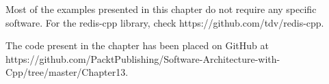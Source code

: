 Most of the examples presented in this chapter do not require any specific software. For the redis-cpp library, check https://github.com/tdv/redis-cpp.

The code present in the chapter has been placed on GitHub at https://github.com/PacktPublishing/Software-Architecture-with-Cpp/tree/master/Chapter13.